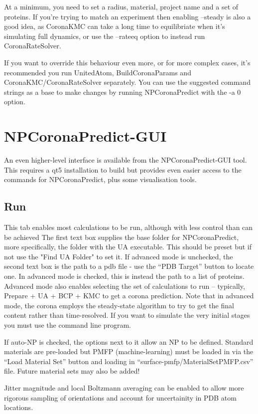 \documentclass[10pt,a4paper,onecolumn]{report}
\begin{document}
At a minimum, you need to set a radius, material, project name and a set of proteins. If you're trying to match an experiment then enabling --steady is also a good idea, as CoronaKMC can take a long time to equilibriate when it's simulating full dynamics, or use the --rateeq option to instead run CoronaRateSolver.


If you want to override this behaviour even more, or for more complex cases, it's recommended you run UnitedAtom, BuildCoronaParams and CoronaKMC/CoronaRateSolver separately. You can use the suggested command strings as a base to make changes by running NPCoronaPredict with the -a 0 option.

\section{NPCoronaPredict-GUI}
An even higher-level interface is available from the NPCoronaPredict-GUI tool. This requires a qt5 installation to build but provides even easier access to the commands for NPCoronaPredict, plus some visualisation tools.

\subsection{Run}
This tab enables most calculations to be run, although with less control than can be achieved
The first text box supplies the base folder for NPCoronaPredict, more specifically, the folder with the UA executable. This should be preset but if not use the "Find UA Folder" to set it.
If advanced mode is unchecked, the second text box is the path to a pdb file - use the ``PDB Target'' button to locate one.
In advanced mode is checked, this is instead the path to a list of proteins. Advanced mode also enables selecting the set of calculations to run -- typically, Prepare + UA + BCP + KMC to get a corona prediction.
Note that in advanced mode, the corona employs the steady-state algorithm to try to get the final content rather than time-resolved. If you want to simulate the very initial stages you must use the command line program.


If auto-NP is checked, the options next to it allow an NP to be defined. Standard materials are pre-loaded but PMFP (machine-learning) must be loaded in via the ``Load Material Set'' button and loading in ``surface-pmfp/MaterialSetPMFP.csv'' file. Future material sets may also be added!

Jitter magnitude and local Boltzmann averaging can be enabled to allow more rigorous sampling of orientations and account for uncertainity in PDB atom locations.
\end{document}
